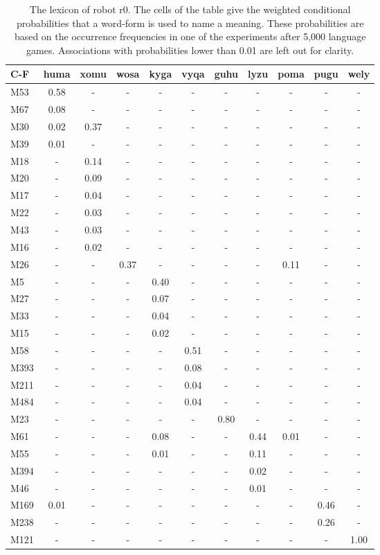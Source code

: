 \begin{table}[t]
\centering
{\footnotesize\begin{tabular}{||l|c|c|c|c|c|c|c|c|c|c||}
\hline\hline
C-F & huma & xomu & wosa & kyga & vyqa & guhu & lyzu & poma & pugu & wely\\\hline
M53 & 0.58 & - & - & - & - & - & - & - & - & -\\\hline
M67 & 0.08 & - & - & - & - & - & - & - & - & -\\\hline
M30 & 0.02 & 0.37 & - & - & - & - & - & - & - & -\\\hline
M39 & 0.01 & - & - & - & - & - & - & - & - & -\\\hline
M18 & - & 0.14 & - & - & - & - & - & - & - & -\\\hline
M20 & - & 0.09 & - & - & - & - & - & - & - & -\\\hline
M17 & - & 0.04 & - & - & - & - & - & - & - & -\\\hline
M22 & - & 0.03 & - & - & - & - & - & - & - & -\\\hline
M43 & - & 0.03 & - & - & - & - & - & - & - & -\\\hline
M16 & - & 0.02 & - & - & - & - & - & - & - & -\\\hline
M26 & - & - & 0.37 & - & - & - & - & 0.11 & - & -\\\hline
M5 & - & - & - & 0.40 & - & - & - & - & - & -\\\hline
M27 & - & - & - & 0.07 & - & - & - & - & - & -\\\hline
M33 & - & - & - & 0.04 & - & - & - & - & - & -\\\hline
M15 & - & - & - & 0.02 & - & - & - & - & - & -\\\hline
M58 & - & - & - & - & 0.51 & - & - & - & - & -\\\hline
M393 & - & - & - & - & 0.08 & - & - & - & - & -\\\hline
M211 & - & - & - & - & 0.04 & - & - & - & - & -\\\hline
M484 & - & - & - & - & 0.04 & - & - & - & - & -\\\hline
M23 & - & - & - & - & - & 0.80 & - & - & - & -\\\hline
M61 & - & - & - & 0.08 & - & - & 0.44 & 0.01 & - & -\\\hline
M55 & - & - & - & 0.01 & - & - & 0.11 & - & - & -\\\hline
M394 & - & - & - & - & - & - & 0.02 & - & - & -\\\hline
M46 & - & - & - & - & - & - & 0.01 & - & - & -\\\hline
M169 & 0.01 & - & - & - & - & - & - & - & 0.46 & -\\\hline
M238 & - & - & - & - & - & - & - & - & 0.26 & -\\\hline
M121 & - & - & - & - & - & - & - & - & - & 1.00\\\hline
\hline
\end{tabular}}
\caption{The lexicon of robot r0. The cells of the table give the weighted conditional probabilities that a word-form is used to name a meaning. These probabilities are based on the occurrence frequencies in one of the experiments after 5,000 language games. Associations with probabilities lower than 0.01 are left out for clarity.}
\label{t:st:lexicon0}
\end{table}

